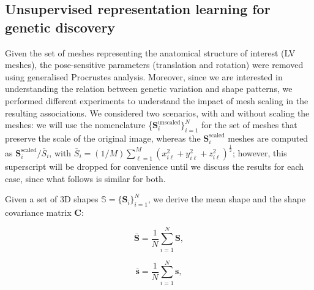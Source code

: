 

\subsection{Unsupervised representation learning for genetic discovery}
\label{results:dimensionality_reduction}
Given the set of meshes representing the anatomical structure of interest (LV meshes), the pose-sensitive parameters (translation and rotation) were removed using generalised Procrustes analysis. Moreover, since we are interested in understanding the relation between genetic variation and shape patterns, we performed different experiments to understand the impact of mesh scaling in the resulting associations. We considered two scenarios, with and without scaling the meshes: we will use the nomenclature \{$\textbf{S}_{i}^{\text{unscaled}}\}_{i=1}^{N}$ for the set of meshes that preserve the scale of the original image, whereas the $\textbf{S}_{i}^{\text{scaled}}$ meshes are computed as $\textbf{S}_{i}^{\text{scaled}}/\bar{S}_i$, with $\bar{S}_i=(1/M)\sum_{\ell=1}^{M}(x_{i\ell}^2+y_{i\ell}^2+z_{i\ell}^2)^{\frac{1}{2}}$; however, this superscript will be dropped for convenience until we discuss the results for each case, since what follows is similar for both.

Given a set of 3D shapes $\mathbb{S}=\{\textbf{S}_i\}_{i=1}^{N}$, we derive the mean shape and the shape covariance matrix $\textbf{C}$:

\begin{equation}
\bar{\textbf{S}}=\frac{1}{N}\sum_{i=1}^{N}{\textbf{S}},
\end{equation}

\begin{equation}
\bar{\textbf{s}}=\frac{1}{N}\sum_{i=1}^{N}{\textbf{s}},
\end{equation}

